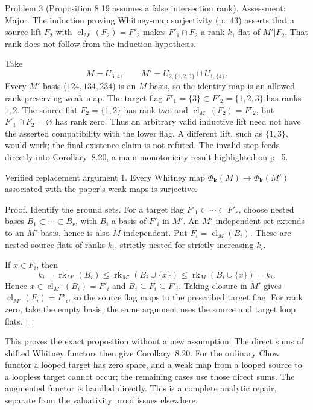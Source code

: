 \documentclass[10pt]{article}
\begin{document}
Problem 3 (Proposition 8.19 assumes a false intersection rank).  Assessment: Major. The induction proving Whitney-map surjectivity (p. 43) asserts that a source lift \(F_2\) with \(\operatorname{cl}_{M'}(F_2)=F'_2\) makes \(F'_1\cap F_2\) a rank-\(k_1\) flat of \(M'|F_2\). That rank does not follow from the induction hypothesis.\par
Take \[M=U_{3,4},\qquad
 M'=U_{2,\{1,2,3\}}\sqcup U_{1,\{4\}}.\] Every \(M'\)-basis (\(124,134,234\)) is an \(M\)-basis, so the identity map is an allowed rank-preserving weak map. The target flag \(F'_1=\{3\}\subset F'_2=\{1,2,3\}\) has ranks \(1,2\). The source flat \(F_2=\{1,2\}\) has rank two and \(\operatorname{cl}_{M'}(F_2)=F'_2\), but \(F'_1\cap F_2=\varnothing\) has rank zero. Thus an arbitrary valid inductive lift need not have the asserted compatibility with the lower flag. A different lift, such as \(\{1,3\}\), would work; the final existence claim is not refuted. The invalid step feeds directly into Corollary 8.20, a main monotonicity result highlighted on p. 5.\par
Verified replacement argument 1.  Every Whitney map \(\Phi_{\boldsymbol k}(M)\to\Phi_{\boldsymbol k}(M')\) associated with the paper’s weak maps is surjective.\par
Proof. Identify the ground sets. For a target flag \(F'_1\subset\cdots\subset F'_r\), choose nested bases \(B_1\subset\cdots\subset B_r\), with \(B_i\) a basis of \(F'_i\) in \(M'\). An \(M'\)-independent set extends to an \(M'\)-basis, hence is also \(M\)-independent. Put \(F_i=\operatorname{cl}_M(B_i)\). These are nested source flats of ranks \(k_i\), strictly nested for strictly increasing \(k_i\).\par
If \(x\in F_i\), then \[k_i=\operatorname{rk}_{M'}(B_i)
 \leq\operatorname{rk}_{M'}(B_i\cup\{x\})
 \leq\operatorname{rk}_M(B_i\cup\{x\})=k_i.\] Hence \(x\in\operatorname{cl}_{M'}(B_i)=F'_i\) and \(B_i\subseteq F_i\subseteq F'_i\). Taking closure in \(M'\) gives \(\operatorname{cl}_{M'}(F_i)=F'_i\), so the source flag maps to the prescribed target flag. For rank zero, take the empty basis; the same argument uses the source and target loop flats. ◻\par
This proves the exact proposition without a new assumption. The direct sums of shifted Whitney functors then give Corollary 8.20. For the ordinary Chow functor a looped target has zero space, and a weak map from a looped source to a loopless target cannot occur; the remaining cases use those direct sums. The augmented functor is handled directly. This is a complete analytic repair, separate from the valuativity proof issues elsewhere.\par
\end{document}
